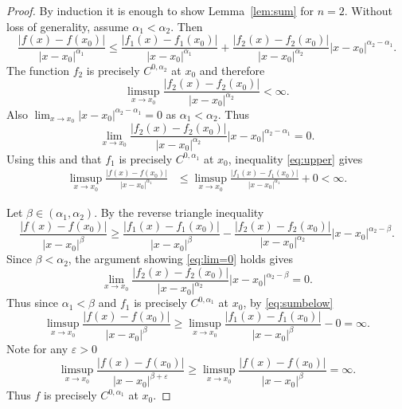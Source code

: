 \documentclass[12pt]{amsart}
\newcommand{\adj}{{precisely }} %
\numberwithin{equation}{section}
\newcommand{\e}{\varepsilon}            %
\theoremstyle{definition}
\theoremstyle{remark}
\begin{document}
\begin{proof}
  By induction it is enough to show  Lemma~\ref{lem:sum} for $n=2$.
  Without loss of generality, assume $\alpha_1< \alpha_2$.  
Then
\begin{equation}\label{eq:upper}
\frac{|f(x) - f(x_0)|}{|x-x_0|^{\alpha_1}} 
\le \frac{|f_1(x) - f_1(x_0)|}{|x-x_0|^{\alpha_1}} 
    +  \frac{|f_2(x) - f_2(x_0)|}{|x-x_0|^{\alpha_2}} |x-x_0|^{\alpha_2 - \alpha_1}.
\end{equation}
The function $f_2$ is \adj $C^{0,\alpha_2}$ at $x_0$ and therefore
$$
\limsup_{x\to x_0} \frac{|f_2(x) - f_2(x_0)|}{|x-x_0|^{\alpha_2}} < \infty.
$$
Also $\lim_{x\to x_0} |x-x_0|^{\alpha_2 - \alpha_1} =0$ as $\alpha_1<\alpha_2$.
Thus
\begin{equation}\label{eq:lim=0}
    \lim_{x\to x_0} \frac{|f_2(x) - f_2(x_0)|}{|x-x_0|^{\alpha_2}} |x-x_0|^{\alpha_2 - \alpha_1}=0.
\end{equation}
Using this and that $f_1$ is \adj $C^{0,\alpha_1}$ at $x_0$,
inequality \eqref{eq:upper} gives
\begin{align*}
    \limsup_{x\to x_0} \frac{|f(x) - f(x_0)|}{|x-x_0|^{\alpha_1}} 
    &\le\limsup_{x\to x_0}  \frac{|f_1(x) - f_1(x_0)|}{|x-x_0|^{\alpha_1}}  + 0
    <  \infty .
\end{align*}

Let $\beta\in (\alpha_1,\alpha_2)$. 
By the reverse triangle inequality
\begin{equation}
  \label{eq:sumbelow}
\frac{|f(x) - f(x_0)|}{|x-x_0|^{\beta}} \ge
 \frac{|f_1(x) - f_1(x_0)|}{|x-x_0|^{\beta}} 
    -  \frac{|f_2(x) - f_2(x_0)|}{|x-x_0|^{\alpha_2}} |x-x_0|^{\alpha_2-\beta}.
\end{equation}
Since $\beta<\alpha_2$, the argument  showing \eqref{eq:lim=0} holds  gives
$$
\lim_{x\to x_0} \frac{|f_2(x) - f_2(x_0)|}{|x-x_0|^{\alpha_2}} |x-x_0|^{\alpha_2-\beta}=0.
$$
Thus since $\alpha_1<\beta$ and  $f_1$ is \adj $C^{0,\alpha_1}$ at $x_0$,
by  \eqref{eq:sumbelow} 
$$
\limsup_{x\to x_0} \frac{|f(x) - f(x_0)|}{|x-x_0|^{\beta}} 
 \ge \limsup_{x\to x_0}  \frac{|f_1(x) - f_1(x_0)|}{|x-x_0|^{\beta}} - 0 = \infty.
 $$
 Note for  any $\e>0$
 $$
 \limsup_{x\to x_0} \frac{|f(x) - f(x_0)|}{|x-x_0|^{\beta + \e}} \geq
 \limsup_{x\to x_0} \frac{|f(x) - f(x_0)|}{|x-x_0|^{\beta}} = \infty.
 $$
Thus $f$ is \adj $C^{0,\alpha_1}$ at $x_0$.
\end{proof}
\end{document}

